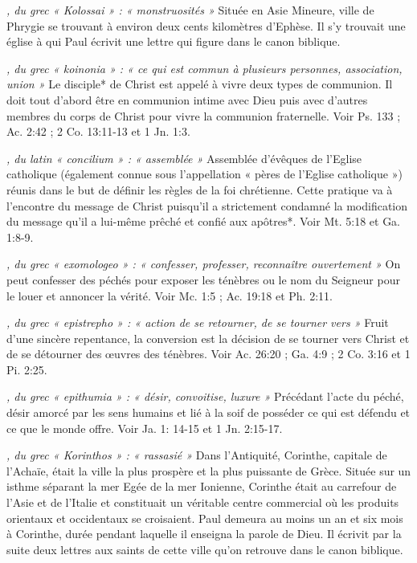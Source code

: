 \begin{multicols}{2}
\textit{, du grec « Kolossai » : « monstruosités »}\newline
Située en Asie Mineure, ville de Phrygie se trouvant à environ deux cents kilomètres d'Ephèse. Il s'y trouvait une église à qui Paul écrivit une lettre qui figure dans le canon biblique.

\textit{, du grec « koinonia » : « ce qui est commun à plusieurs personnes, association, union »}\newline
Le disciple* de Christ est appelé à vivre deux types de communion. Il doit tout d'abord être en communion intime avec Dieu puis avec d'autres membres du corps de Christ pour vivre la communion fraternelle. Voir Ps. 133 ; Ac. 2:42 ; 2 Co. 13:11-13 et 1 Jn. 1:3.

\textit{, du latin « concilium » : « assemblée »}\newline
Assemblée d'évêques de l'Eglise catholique (également connue sous l'appellation « pères de l'Eglise catholique ») réunis dans le but de définir les règles de la foi chrétienne. Cette pratique va à l'encontre du message de Christ puisqu'il a strictement condamné la modification du message qu'il a lui-même prêché et confié aux apôtres*. Voir Mt. 5:18 et Ga. 1:8-9.

\textit{, du grec « exomologeo » : « confesser, professer, reconnaître ouvertement »}\newline
On peut confesser des péchés pour exposer les ténèbres ou le nom du Seigneur pour le louer et annoncer la vérité. Voir Mc. 1:5 ; Ac. 19:18 et Ph. 2:11.

\textit{, du grec « epistrepho » : « action de se retourner, de se tourner vers »}\newline
Fruit d'une sincère repentance, la conversion est la décision de se tourner vers Christ et de se détourner des œuvres des ténèbres. Voir Ac. 26:20 ; Ga. 4:9 ; 2 Co. 3:16 et 1 Pi. 2:25.

\textit{, du grec « epithumia » : « désir, convoitise, luxure »}\newline
Précédant l'acte du péché, désir amorcé par les sens humains et lié à la soif de posséder ce qui est défendu et ce que le monde offre. Voir Ja. 1: 14-15 et 1 Jn. 2:15-17.

\textit{, du grec « Korinthos » : « rassasié »}\newline
Dans l'Antiquité, Corinthe, capitale de l'Achaïe, était la ville la plus prospère et la plus puissante de Grèce. Située sur un isthme séparant la mer Egée de la mer Ionienne, Corinthe était au carrefour de l'Asie et de l'Italie et constituait un véritable centre commercial où les produits orientaux et occidentaux se croisaient. Paul demeura au moins un an et six mois à Corinthe, durée pendant laquelle il enseigna la parole de Dieu. Il écrivit par la suite deux lettres aux saints de cette ville qu'on retrouve dans le canon biblique.


\end{multicols}
